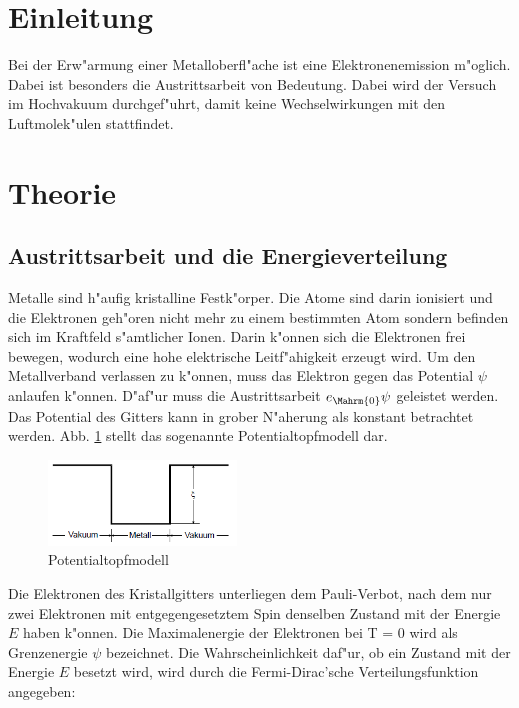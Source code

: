\section{Einleitung} %
\label{sec:einleitung}

Bei der Erw"armung einer Metalloberfl"ache ist eine Elektronenemission m"oglich.
Dabei ist besonders die Austrittsarbeit von Bedeutung.
Dabei wird der Versuch im Hochvakuum durchgef"uhrt, damit keine Wechselwirkungen mit den Luftmolek"ulen stattfindet.

\section{Theorie} %
\label{sec:theorie}

\subsection{Austrittsarbeit und die Energieverteilung} %
\label{sub:austrittsarbeit_und_die_energieverteilung}

Metalle sind h"aufig kristalline Festk"orper.
Die Atome sind darin ionisiert und die Elektronen geh"oren nicht mehr zu einem bestimmten Atom sondern befinden sich im Kraftfeld s"amtlicher Ionen.
Darin k"onnen sich die Elektronen frei bewegen, wodurch eine hohe elektrische Leitf"ahigkeit erzeugt wird.
Um den Metallverband verlassen zu k"onnen, muss das Elektron gegen das Potential $\psi$ anlaufen k"onnen.
D"af"ur muss die Austrittsarbeit $e_\Mahrm{0}\psi$ geleistet werden.
Das Potential des Gitters kann in grober N"aherung als konstant betrachtet werden.
Abb. \ref{potential_topf} stellt das sogenannte Potentialtopfmodell dar.

\begin{figure}[!h]
	\centering
	\includegraphics[width = 5cm]{img/Potentialtopf.PNG}
	\caption{Potentialtopfmodell}
	\label{potential_topf}
\end{figure}

Die Elektronen des Kristallgitters unterliegen dem Pauli-Verbot, nach dem nur zwei Elektronen mit entgegengesetztem Spin denselben Zustand mit der Energie $E$ haben k"onnen.
Die Maximalenergie der Elektronen bei T = 0 wird als Grenzenergie $\psi$ bezeichnet.
Die Wahrscheinlichkeit daf"ur, ob ein Zustand mit der Energie $E$ besetzt wird, wird durch die Fermi-Dirac'sche Verteilungsfunktion angegeben:


